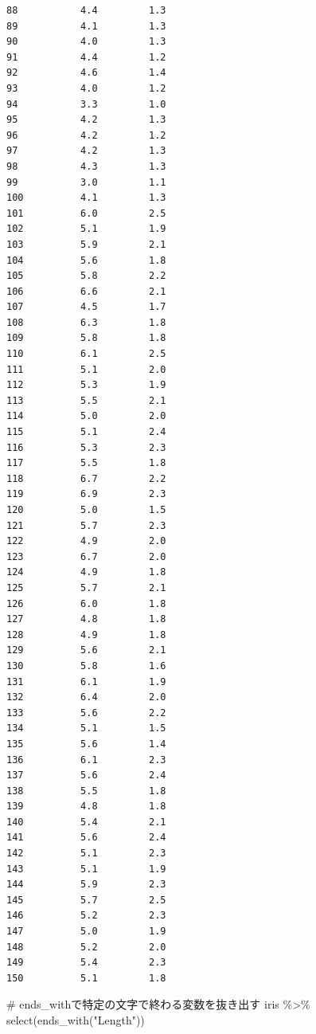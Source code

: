 \documentclass[
  a4paper,
]{ltjsbook}
\newenvironment{Shaded}{\begin{snugshade}}{\end{snugshade}}
\newcommand{\CommentTok}[1]{\textcolor[rgb]{0.37,0.37,0.37}{#1}}
\newcommand{\FunctionTok}[1]{\textcolor[rgb]{0.28,0.35,0.67}{#1}}
\newcommand{\NormalTok}[1]{\textcolor[rgb]{0.00,0.23,0.31}{#1}}
\newcommand{\SpecialCharTok}[1]{\textcolor[rgb]{0.37,0.37,0.37}{#1}}
\newcommand{\StringTok}[1]{\textcolor[rgb]{0.13,0.47,0.30}{#1}}
\begin{document}
\begin{verbatim}
88           4.4         1.3
89           4.1         1.3
90           4.0         1.3
91           4.4         1.2
92           4.6         1.4
93           4.0         1.2
94           3.3         1.0
95           4.2         1.3
96           4.2         1.2
97           4.2         1.3
98           4.3         1.3
99           3.0         1.1
100          4.1         1.3
101          6.0         2.5
102          5.1         1.9
103          5.9         2.1
104          5.6         1.8
105          5.8         2.2
106          6.6         2.1
107          4.5         1.7
108          6.3         1.8
109          5.8         1.8
110          6.1         2.5
111          5.1         2.0
112          5.3         1.9
113          5.5         2.1
114          5.0         2.0
115          5.1         2.4
116          5.3         2.3
117          5.5         1.8
118          6.7         2.2
119          6.9         2.3
120          5.0         1.5
121          5.7         2.3
122          4.9         2.0
123          6.7         2.0
124          4.9         1.8
125          5.7         2.1
126          6.0         1.8
127          4.8         1.8
128          4.9         1.8
129          5.6         2.1
130          5.8         1.6
131          6.1         1.9
132          6.4         2.0
133          5.6         2.2
134          5.1         1.5
135          5.6         1.4
136          6.1         2.3
137          5.6         2.4
138          5.5         1.8
139          4.8         1.8
140          5.4         2.1
141          5.6         2.4
142          5.1         2.3
143          5.1         1.9
144          5.9         2.3
145          5.7         2.5
146          5.2         2.3
147          5.0         1.9
148          5.2         2.0
149          5.4         2.3
150          5.1         1.8
\end{verbatim}

\begin{Shaded}
\begin{Highlighting}[]
\CommentTok{\# ends\_withで特定の文字で終わる変数を抜き出す}
\NormalTok{iris }\SpecialCharTok{\%\textgreater{}\%} \FunctionTok{select}\NormalTok{(}\FunctionTok{ends\_with}\NormalTok{(}\StringTok{"Length"}\NormalTok{))}
\end{Highlighting}
\end{Shaded}
\end{document}
